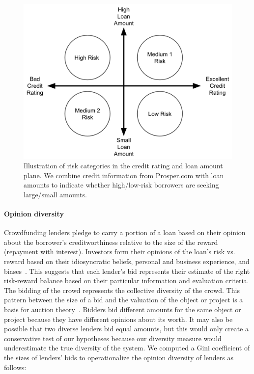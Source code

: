 \documentclass[sigconf]{acmart}
\begin{document}
\begin{figure}[!h]
    \centering
    \includegraphics[scale=.27]{samples/figs/credit_risk_illustration.png}
    \caption{Illustration of risk categories in the credit rating and loan amount plane. We combine credit information from Prosper.com with loan amounts to indicate whether high/low-risk borrowers are seeking large/small amounts.}
    \label{fig:credit-risk-illustration}
    \vspace{-1em}
\end{figure}

\paragraph{Opinion diversity} Crowdfunding lenders pledge to carry a portion of a loan based on their opinion about the borrower's creditworthiness relative to the size of the reward (repayment with interest). Investors form their opinions of the loan’s risk vs. reward based on their idiosyncratic beliefs, personal and business experience, and biases~\cite{Feeney1999,Jordan2002,Mason2004,Buttner1989,brooks2014investors}. This suggests that each lender's bid represents their estimate of the right risk-reward balance based on their particular information and evaluation criteria. The bidding of the crowd represents the collective diversity of the crowd. This pattern between the size of a bid and the valuation of the object or project is a basis for auction theory~\cite{wilson1992strategic}.  Bidders bid different amounts for the same object or project because they have different opinions about its worth. It may also be possible that two diverse lenders bid equal amounts, but this would only create a conservative test of our hypotheses because our diversity measure would underestimate the true diversity of the system. We computed a Gini coefficient of the sizes of lenders' bids to operationalize the opinion diversity of lenders as follows: 
\end{document}
